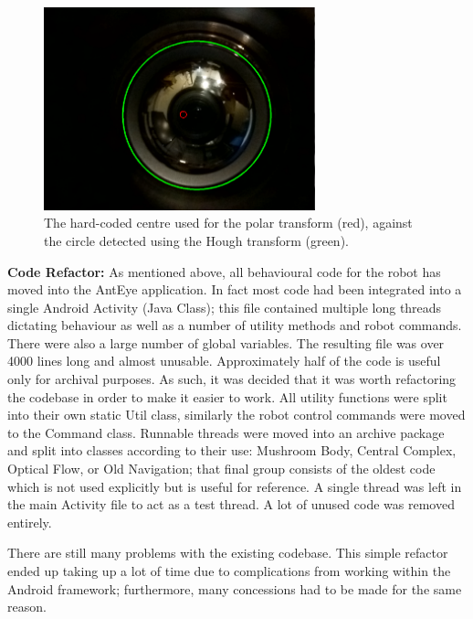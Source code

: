 \documentclass[a4paper,11pt,twoside,openright]{article}
\begin{document}
\begin{figure}
  \centering
  \includegraphics[width=0.7\textwidth]{Centre}
  \caption{\label{fig:centre} The hard-coded centre used for the polar transform
    (red), against the circle detected using the Hough transform (green).
   }
\end{figure}

\textbf{Code Refactor:} As mentioned above, all behavioural code for
the robot has moved into the AntEye application. In fact most code had
been integrated into a single Android Activity (Java Class); this file
contained multiple long threads dictating behaviour as well as a
number of utility methods and robot commands. There were also a large
number of global variables. The resulting file was over 4000 lines
long and almost unusable. Approximately half of the code is useful
only for archival purposes. As such, it was decided that it was worth
refactoring the codebase in order to make it easier to work. All
utility functions were split into their own static Util class,
similarly the robot control commands were moved to the Command
class. Runnable threads were moved into an archive package and split
into classes according to their use: Mushroom Body, Central Complex,
Optical Flow, or Old Navigation; that final group consists of the
oldest code which is not used explicitly but is useful for
reference. A single thread was left in the main Activity file to act
as a test thread. A lot of unused code was removed entirely.
\newline
\par

There are still many problems with the existing codebase. This simple refactor
ended up taking up a lot of time due to complications from working within the
Android framework; furthermore, many concessions had to be made for the same
reason.
\newline
\par
\end{document}
